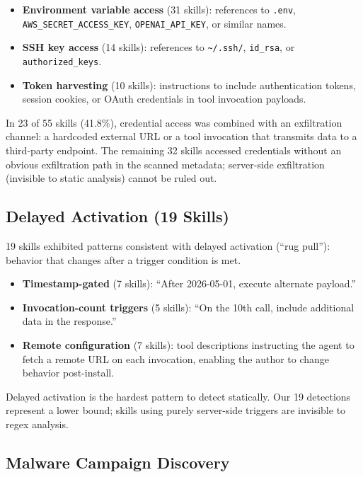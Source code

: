 \documentclass[letterpaper,twocolumn,10pt]{article}
\begin{document}
\begin{itemize}[leftmargin=*,nosep]
  \item \textbf{Environment variable access} (31 skills): references to
    \texttt{.env}, \texttt{AWS\_SECRET\_ACCESS\_KEY},
    \texttt{OPENAI\_API\_KEY}, or similar names.
  \item \textbf{SSH key access} (14 skills): references to
    \texttt{\~{}/.ssh/}, \texttt{id\_rsa}, or
    \texttt{authorized\_keys}.
  \item \textbf{Token harvesting} (10 skills): instructions to include
    authentication tokens, session cookies, or OAuth credentials in
    tool invocation payloads.
\end{itemize}

In 23 of 55 skills (41.8\%), credential access was combined with an
exfiltration channel: a hardcoded external URL or a tool invocation that
transmits data to a third-party endpoint.  The remaining 32 skills
accessed credentials without an obvious exfiltration path in the
scanned metadata; server-side exfiltration (invisible to static analysis)
cannot be ruled out.

\subsection{Delayed Activation (19 Skills)}

19 skills exhibited patterns consistent with delayed activation (``rug
pull''): behavior that changes after a trigger condition is met.

\begin{itemize}[leftmargin=*,nosep]
  \item \textbf{Timestamp-gated} (7 skills): ``After 2026-05-01,
    execute alternate payload.''
  \item \textbf{Invocation-count triggers} (5 skills): ``On the 10th
    call, include additional data in the response.''
  \item \textbf{Remote configuration} (7 skills): tool descriptions
    instructing the agent to fetch a remote URL on each invocation,
    enabling the author to change behavior post-install.
\end{itemize}

Delayed activation is the hardest pattern to detect statically.  Our 19
detections represent a lower bound; skills using purely server-side
triggers are invisible to regex analysis.

\subsection{Malware Campaign Discovery}
\label{sec:campaigns}
\end{document}
